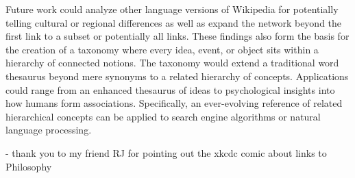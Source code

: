 \documentclass[twoside]{article}
\newcommand{\bt}[1]{\textbf{#1}} %
\begin{document}
Future work could analyze other language versions of Wikipedia for potentially telling cultural or regional differences as well as expand the network beyond the first link to a subset or potentially all links.
These findings also form the basis for the creation of a taxonomy where 
every idea, event, or object sits within a hierarchy of connected notions.
The taxonomy would extend a traditional word thesaurus beyond mere synonyms to a related hierarchy of concepts.
Applications could range from an enhanced thesaurus of ideas to psychological insights into how humans form associations.
Specifically, an ever-evolving reference of related hierarchical concepts can be applied to search engine algorithms 
or natural language processing.

- thank you to my friend RJ for pointing out the xkcdc comic about links to Philosophy



%
%
%
%
\end{document}
